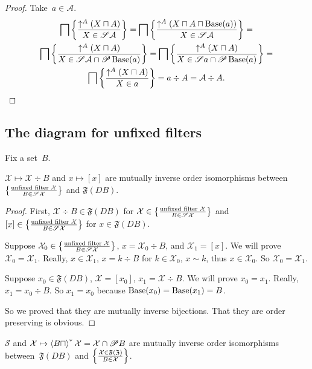 \begin{proof}
Take~$a\in\mathcal{A}$.
\begin{multline*}
\bigsqcap\left\{ \frac{\uparrow^A(X\sqcap A)}{X\in\mathscr{S}\mathcal{A}}\right\} =
\bigsqcap\left\{ \frac{\uparrow^A(X\sqcap A\sqcap\operatorname{Base}(a))}{X\in\mathscr{S}\mathcal{A}}\right\} = \\
\bigsqcap\left\{ \frac{\uparrow^A(X\sqcap A)}{X\in\mathscr{S}\mathcal{A}\cap\mathscr{P}\operatorname{Base}(a)}\right\} =
\bigsqcap\left\{ \frac{\uparrow^A(X\sqcap A)}{X\in\mathscr{S}a\cap\mathscr{P}\operatorname{Base}(a)}\right\} = \\
\bigsqcap\left\{ \frac{\uparrow^A(X\sqcap A)}{X\in a}\right\}=
a\div A = \mathcal{A}\div A.
\end{multline*}
\end{proof}

\subsection{The diagram for unfixed filters}

Fix a set~$B$.

\begin{lem}
$\mathcal{X}\mapsto\mathcal{X}\div B$ and $x\mapsto[x]$ are
mutually inverse order isomorphisms between
$\left\{ \frac{\text{unfixed filter }\mathcal{X}}{B\in\mathscr{S}\mathcal{X}}\right\}$ and $\mathfrak{F}(DB)$.
\end{lem}

\begin{proof}
First, $\mathcal{X}\div B\in\mathfrak{F}(DB)$ for
$\mathcal{X}\in\left\{ \frac{\text{unfixed filter }\mathcal{X}}{B\in\mathscr{S}\mathcal{X}}\right\}$ and
$[x]\in\left\{ \frac{\text{unfixed filter }\mathcal{X}}{B\in\mathscr{S}\mathcal{X}}\right\}$
for $x\in\mathfrak{F}(DB)$.

Suppose $\mathcal{X}_0\in\left\{ \frac{\text{unfixed filter }\mathcal{X}}{B\in\mathscr{S}\mathcal{X}}\right\}$,
$x=\mathcal{X}_0\div B$, and $\mathcal{X}_1=[x]$. We will prove
$\mathcal{X}_0=\mathcal{X}_1$. Really, $x\in\mathcal{X}_1$,
$x=k\div B$ for $k\in\mathcal{X}_0$, $x\sim k$, thus
$x\in\mathcal{X}_0$. So $\mathcal{X}_0=\mathcal{X}_1$.

Suppose $x_0\in\mathfrak{F}(DB)$, $\mathcal{X}=[x_0]$,
$x_1=\mathcal{X}\div B$. We will prove $x_0=x_1$. Really,
$x_1=x_0\div B$. So $x_1=x_0$ because
$\operatorname{Base}(x_0)=\operatorname{Base}(x_1)=B$.

So we proved that they are mutually inverse bijections. That
they are order preserving is obvious.
\end{proof}

\begin{lem}
$\mathscr{S}$ and
$\mathcal{X}\mapsto\left\langle B\sqcap\right\rangle ^{\ast}\mathcal{X}=
\mathcal{X}\cap\mathscr{P} B$
are mutually inverse order isomorphisms
between~$\mathfrak{F}(DB)$ and
$\left\{ \frac{\mathcal{X}\in\mathfrak{F}(\mathfrak{Z})}{B\in\mathcal{X}}\right\}$.
\end{lem}

